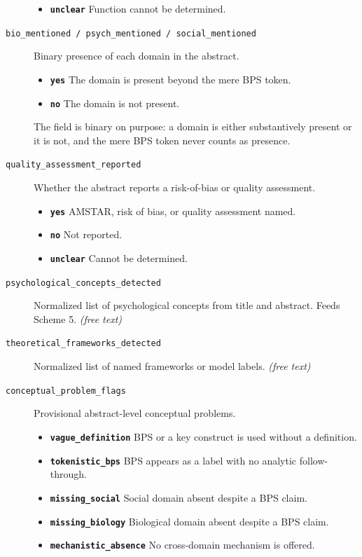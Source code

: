 \documentclass[11pt]{article}
\begin{document}
\begin{description}
\begin{itemize}[leftmargin=1.3em,itemsep=2pt,topsep=2pt]
  \item \textbf{\texttt{unclear}} Function cannot be determined.
  \end{itemize}
\item[\texttt{bio\_mentioned / psych\_mentioned / social\_mentioned}] Binary presence of each domain in the abstract.
  \begin{itemize}[leftmargin=1.3em,itemsep=2pt,topsep=2pt]
  \item \textbf{\texttt{yes}} The domain is present beyond the mere BPS token.
  \item \textbf{\texttt{no}} The domain is not present.
  \end{itemize}
{\small The field is binary on purpose: a domain is either substantively present or it is not, and the mere BPS token never counts as presence.}
\item[\texttt{quality\_assessment\_reported}] Whether the abstract reports a risk-of-bias or quality assessment.
  \begin{itemize}[leftmargin=1.3em,itemsep=2pt,topsep=2pt]
  \item \textbf{\texttt{yes}} AMSTAR, risk of bias, or quality assessment named.
  \item \textbf{\texttt{no}} Not reported.
  \item \textbf{\texttt{unclear}} Cannot be determined.
  \end{itemize}
\item[\texttt{psychological\_concepts\_detected}] Normalized list of psychological concepts from title and abstract. Feeds Scheme 5. \textit{(free text)}
\item[\texttt{theoretical\_frameworks\_detected}] Normalized list of named frameworks or model labels. \textit{(free text)}
\item[\texttt{conceptual\_problem\_flags}] Provisional abstract-level conceptual problems.
  \begin{itemize}[leftmargin=1.3em,itemsep=2pt,topsep=2pt]
  \item \textbf{\texttt{vague\_definition}} BPS or a key construct is used without a definition.
  \item \textbf{\texttt{tokenistic\_bps}} BPS appears as a label with no analytic follow-through.
  \item \textbf{\texttt{missing\_social}} Social domain absent despite a BPS claim.
  \item \textbf{\texttt{missing\_biology}} Biological domain absent despite a BPS claim.
  \item \textbf{\texttt{mechanistic\_absence}} No cross-domain mechanism is offered.

\end{itemize}
\end{description}
\end{document}
